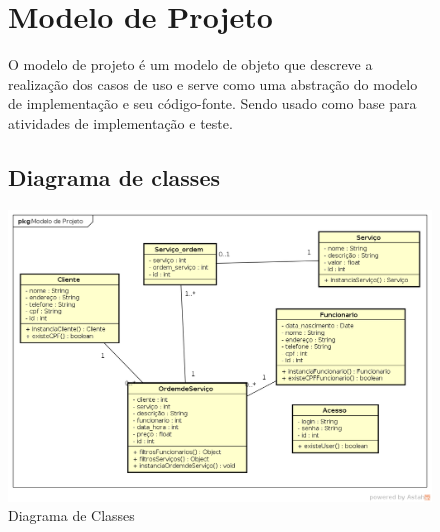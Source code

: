 \documentclass[
	12pt,				%
	openright,
	oneside,			%
	a4paper,			%
	chapter=TITLE,		%
	brazil				%
	]{abntex2}
\begin{document}




\begin{figure}[h!]
\section{Modelo de Projeto}
	O modelo de projeto é um modelo de objeto que descreve a realização dos casos de uso e serve como uma abstração do modelo de implementação e seu código-fonte. Sendo usado como base para atividades de implementação e teste.


\subsection{Diagrama de classes}


	\caption{Diagrama de Classes}
	\begin{center}
	    \includegraphics[scale=0.5]{Arquivos/diagrama_classes}  
	\end{center}
\end{figure}
\end{document}
